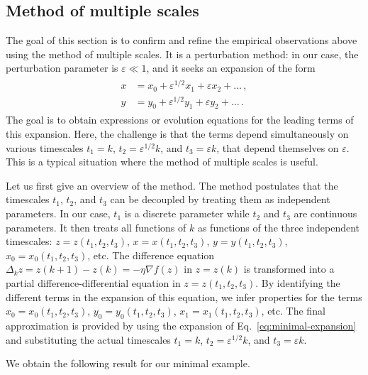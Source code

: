 \documentclass[11pt,english,reqno]{article}
\theoremstyle{plain}
\theoremstyle{definition}
\theoremstyle{remark}
\numberwithin{equation}{section}
\begin{document}
\subsection{Method of multiple scales}
\label{sec:mms}

The goal of this section is to confirm and refine the empirical observations above using the method of multiple scales. It is a perturbation method: in our case, the perturbation parameter is $\varepsilon \ll 1$, and it seeks an expansion of the form
\begin{align}
    \label{eq:minimal-expansion}
    \begin{split}
    x &= x_0 + \varepsilon^{1/2} x_1 + \varepsilon x_2 + \dots \, , \\
    y &= y_0 + \varepsilon^{1/2} y_1 + \varepsilon y_2 + \dots \, .
    \end{split}
\end{align}
The goal is to obtain expressions or evolution equations for the leading terms of this expansion. Here, the challenge is that the terms depend simultaneously on various timescales $t_1 = k$, $t_2 = \varepsilon^{1/2} k$, and $t_3 = \varepsilon k$, that depend themselves on $\varepsilon$. This is a typical situation where the method of multiple scales is useful.

Let us first give an overview of the method. The method postulates that the timescales $t_1$, $t_2$, and $t_3$ can be decoupled by treating them as independent parameters. In our case, $t_1$ is a discrete parameter while $t_2$ and $t_3$ are continuous parameters. It then treats all functions of $k$ as functions of the three independent timescales: $z = z(t_1, t_2, t_3)$, $x = x(t_1, t_2, t_3)$, $y = y(t_1, t_2, t_3)$, $x_0 = x_0(t_1, t_2, t_3)$, etc. The difference equation $\Delta_k z = z(k+1) - z(k) =  - \eta \nabla f(z)$ in $z = z(k)$ is transformed into a partial difference-differential equation in $z = z(t_1, t_2, t_3)$. By identifying the different terms in the expansion of this equation, we infer properties for the terms $x_0 = x_0(t_1, t_2, t_3)$, $y_0 = y_0(t_1, t_2, t_3)$, $x_1 = x_1(t_1, t_2, t_3)$, etc. The final approximation is provided by using the expansion of Eq.~\eqref{eq:minimal-expansion} and substituting the actual timescales $t_1 = k$, $t_2 = \varepsilon^{1/2} k$, and $t_3 = \varepsilon k$.

We obtain the following result for our minimal example.
\end{document}
